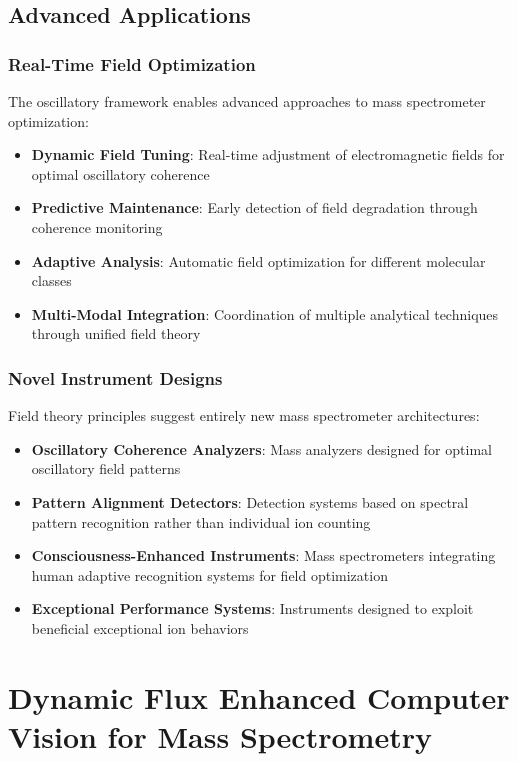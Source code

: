 \documentclass[11pt,a4paper]{article}
\theoremstyle{remark}
\begin{document}
\subsection{Advanced Applications}

\subsubsection{Real-Time Field Optimization}

The oscillatory framework enables advanced approaches to mass spectrometer optimization:

\begin{itemize}
\item \textbf{Dynamic Field Tuning}: Real-time adjustment of electromagnetic fields for optimal oscillatory coherence
\item \textbf{Predictive Maintenance}: Early detection of field degradation through coherence monitoring
\item \textbf{Adaptive Analysis}: Automatic field optimization for different molecular classes
\item \textbf{Multi-Modal Integration}: Coordination of multiple analytical techniques through unified field theory
\end{itemize}

\subsubsection{Novel Instrument Designs}

Field theory principles suggest entirely new mass spectrometer architectures:

\begin{itemize}
\item \textbf{Oscillatory Coherence Analyzers}: Mass analyzers designed for optimal oscillatory field patterns
\item \textbf{Pattern Alignment Detectors}: Detection systems based on spectral pattern recognition rather than individual ion counting
\item \textbf{Consciousness-Enhanced Instruments}: Mass spectrometers integrating human adaptive recognition systems for field optimization
\item \textbf{Exceptional Performance Systems}: Instruments designed to exploit beneficial exceptional ion behaviors
\end{itemize}

\section{Dynamic Flux Enhanced Computer Vision for Mass Spectrometry}
\end{document}
